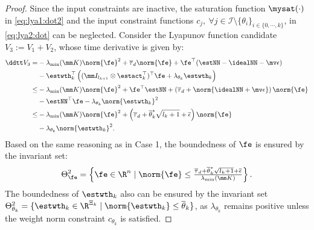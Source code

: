 \documentclass[letterpaper, journal]{IEEEtran}
\begin{document}
\begin{proof}
Since the input constraints are inactive, the saturation function $\mysat(\cdot)$ in \eqref{eq:lya1:dot2} and the input constraint functions $c_j,\ \forall j\in\mathcal I \setminus \{\theta_i\}_{i\in\{0,\cdots,k\}}$, in \eqref{eq:lya2:dot} can be neglected.
Consider the Lyapunov function candidate $V_3:=V_1+V_2$, whose time derivative is given by:
\begin{equation}
    \begin{aligned}
        \ddtt V_3
        =&
        -\lambda_{\min}(\mm K)\norm{\fe}^2
        +\overline\tau_d\norm{\fe}
        +\fe^\top (\estNN - \idealNN - \mv\epsilon)
        \\
        &
        -\estwth_k^\top 
        \left(
            (\mm I_{l_{k+1}}\otimes \estact_k^\top)^\top
            \fe
            +
            \lambda_{\theta_k}\estwth_k
        \right)
        \\
        \le&
        -\lambda_{\min}(\mm K)\norm{\fe}^2
        +\fe^\top \estNN
        +
        \left(
            \overline\tau_d+\norm{
                \idealNN+\mv\epsilon
            }
        \right)
        \norm{\fe}
        \\
        &
        -\estNN^\top\fe 
        -\lambda_{\theta_k}\norm{\estwth_k}^2
        \\
        \le&
        -
        \lambda_{\min}(\mm K)
        \norm{\fe}^2
        +
        \left(
            \overline\tau_d
            +
            \overline{\theta}^*_k\sqrt{l_{k}+1}
            +
            \overline{\epsilon}
        \right)
        \norm{\fe}
        \\
        &
        -
        \lambda_{\theta_k}\norm{\estwth_k}^2
        .
    \end{aligned}
    \label{eq:lya3:dot}
\end{equation}
Based on the same reasoning as in Case 1, the boundedness of $\fe$ is ensured by the invariant set:
\begin{equation}
    \Theta_{\fe}^{2}
    =
    \left\{ 
        \fe \in \R^n 
        \mid 
        \norm{\fe} 
        \le 
        \tfrac{
            \overline\tau_d
            +
            \overline{\theta}^*_k\sqrt{l_{k}+1}
            +
            \overline{\epsilon}
        }{
            \lambda_{\min}(\mm K)
        }
    \right\}
    .
\end{equation}
The boundedness of $\estwth_k$ also can be ensured by the invariant set $\Theta_{\theta_k}^{2}=\{ \estwth_k \in \R^{\Xi_{k}} \mid \norm{\estwth_k} \le \overline\theta_k \}$, as $\lambda_{\theta_k}$ remains positive unless the weight norm constraint $c_{\theta_k}$ is satisfied.


\end{proof}
\end{document}
